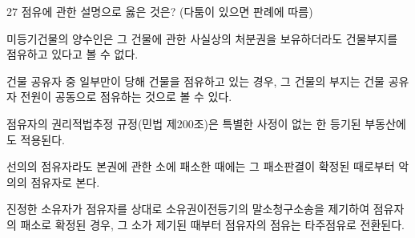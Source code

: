 \begin{question}{27}
점유에 관한 설명으로 옳은 것은? (다툼이 있으면 판례에 따름)
\begin{choices}
  \item 미등기건물의 양수인은 그 건물에 관한 사실상의 처분권을 보유하더라도 건물부지를 점유하고 있다고 볼 수 없다.
  \item 건물 공유자 중 일부만이 당해 건물을 점유하고 있는 경우, 그 건물의 부지는 건물 공유자 전원이 공동으로 점유하는 것으로 볼 수 있다.
  \item 점유자의 권리적법추정 규정(민법 제200조)은 특별한 사정이 없는 한 등기된 부동산에도 적용된다.
  \item 선의의 점유자라도 본권에 관한 소에 패소한 때에는 그 패소판결이 확정된 때로부터 악의의 점유자로 본다.
  \item 진정한 소유자가 점유자를 상대로 소유권이전등기의 말소청구소송을 제기하여 점유자의 패소로 확정된 경우, 그 소가 제기된 때부터 점유자의 점유는 타주점유로 전환된다.
\end{choices}
\end{question}
